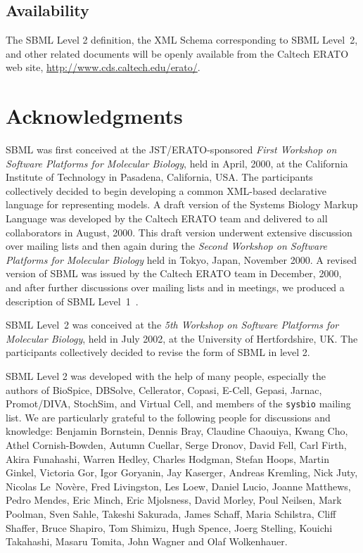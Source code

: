 \documentclass[10pt]{cekarticle}
\begin{document}
\subsection{Availability}
\label{sec:availability}

The SBML Level 2 definition, the XML Schema corresponding to SBML
Level~2, and other related documents will be openly available from the
Caltech ERATO web site, \url{http://www.cds.caltech.edu/erato/}.

\setcounter{secnumdepth}{-1}
\section{Acknowledgments}
\label{sec:acknowledgements}

SBML was first conceived at the JST/ERATO-sponsored \emph{First Workshop on
  Software Platforms for Molecular Biology}, held in April, 2000, at the
California Institute of Technology in Pasadena, California, USA.
The participants collectively decided to begin developing a common
XML-based declarative language for representing models.  A draft
version of the Systems Biology Markup Language was developed by
the Caltech ERATO team and delivered to all collaborators in
August, 2000.  This draft version underwent extensive discussion
over mailing lists and then again during the \emph{Second Workshop
on Software Platforms for Molecular Biology} held in Tokyo, Japan,
November 2000.  A revised version of SBML was issued by the
Caltech ERATO team in December, 2000, and after further
discussions over mailing lists and in meetings, we produced a
description of SBML Level~1~\citep{hucka:2001}.

SBML Level~2 was conceived at the \emph{5th Workshop on
Software Platforms for Molecular Biology}, held in July 2002, at
the University of Hertfordshire, UK.  The participants
collectively decided to revise the form of SBML in level 2.

SBML Level 2 was developed with the help of many people,
especially the authors of BioSpice, DBSolve, Cellerator, Copasi, E-Cell, Gepasi,
Jarnac, Promot/DIVA, StochSim, and Virtual Cell, and members of the
\texttt{sysbio} mailing list.  We are particularly grateful to the
following people for discussions and knowledge: Benjamin Bornstein, Dennis Bray, Claudine Chaouiya, Kwang Cho, Athel Cornish-Bowden, Autumn Cuellar, Serge Dronov, David Fell, Carl Firth, Akira Funahashi, Warren Hedley, Charles Hodgman, Stefan Hoops, Martin Ginkel, Victoria Gor, Igor Goryanin, Jay Kaserger, Andreas Kremling, Nick Juty, Nicolas Le~Nov\`{e}re, Fred Livingston, Les Loew, Daniel Lucio, Joanne Matthews, Pedro Mendes, Eric Minch, Eric Mjolsness, David Morley, Poul Neilsen, Mark Poolman, Sven Sahle, Takeshi Sakurada, James Schaff, Maria Schilstra, Cliff Shaffer, Bruce Shapiro, Tom Shimizu, Hugh Spence, Joerg Stelling, Kouichi Takahashi, Masaru Tomita, John Wagner and Olaf Wolkenhauer.
\end{document}
